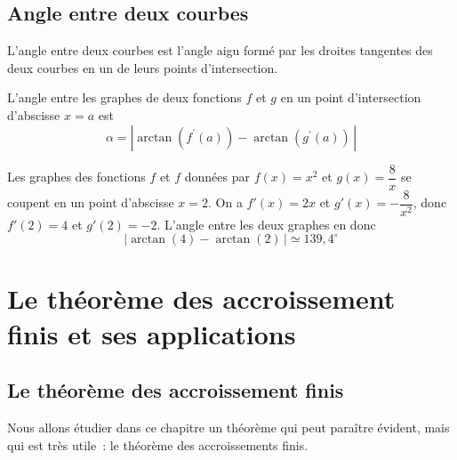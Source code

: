 \documentclass[a4paper,12pt]{article}
\begin{document}
\subsection{Angle entre deux courbes}
\begin{definition}
	\tcblower
	L'angle entre deux courbes est l'angle aigu formé par les droites tangentes des deux courbes en un de leurs points d'intersection.
\end{definition}
\begin{formule}
	\tcblower
	L'angle entre les graphes de deux fonctions $f$ et $g$ en un point d'intersection d'abscisse $x=a$ est 
	\[\alpha=|\arctan(f^\prime(a))-\arctan(g^\prime(a))\,|\]
\end{formule}
\begin{exemple}
	\tcblower
	Les graphes des fonctions $f$ et $f$ données par $f(x)=x^2$ et $g(x)=\dfrac{8}{x}$ se coupent en un point d'abscisse $x=2$. On a $f'(x)=2x$ et $g'(x)=-\dfrac{8}{x^2}$, donc $f'(2)=4$ et $g'(2)=-2$. L'angle entre les deux graphes en donc 
	\[|\arctan(4)-\arctan(2)\,|\simeq 139,4^\circ\]
\end{exemple}

















\newpage
\section{Le théorème des accroissement finis et ses applications}

\subsection{Le théorème des accroissement finis}
Nous allons étudier dans ce chapitre un théorème qui peut paraître évident, mais qui est très utile~: le théorème des accroissements finis. 
\medskip
\end{document}
